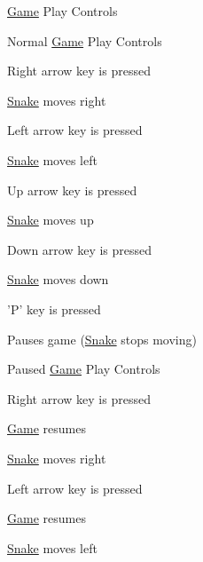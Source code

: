 \hyperlink{classGame}{\-Game} \-Play \-Controls
\begin{DoxyItemize}
\item \-Normal \hyperlink{classGame}{\-Game} \-Play \-Controls
\begin{DoxyItemize}
\item \-Right arrow key is pressed
\begin{DoxyItemize}
\item \hyperlink{classSnake}{\-Snake} moves right
\end{DoxyItemize}
\item \-Left arrow key is pressed
\begin{DoxyItemize}
\item \hyperlink{classSnake}{\-Snake} moves left
\end{DoxyItemize}
\item \-Up arrow key is pressed
\begin{DoxyItemize}
\item \hyperlink{classSnake}{\-Snake} moves up
\end{DoxyItemize}
\item \-Down arrow key is pressed
\begin{DoxyItemize}
\item \hyperlink{classSnake}{\-Snake} moves down
\end{DoxyItemize}
\item '\-P' key is pressed
\begin{DoxyItemize}
\item \-Pauses game (\hyperlink{classSnake}{\-Snake} stops moving)
\end{DoxyItemize}
\end{DoxyItemize}
\item \-Paused \hyperlink{classGame}{\-Game} \-Play \-Controls
\begin{DoxyItemize}
\item \-Right arrow key is pressed
\begin{DoxyItemize}
\item \hyperlink{classGame}{\-Game} resumes
\item \hyperlink{classSnake}{\-Snake} moves right
\end{DoxyItemize}
\item \-Left arrow key is pressed
\begin{DoxyItemize}
\item \hyperlink{classGame}{\-Game} resumes
\item \hyperlink{classSnake}{\-Snake} moves left
\end{DoxyItemize}

\end{DoxyItemize}
\end{DoxyItemize}
